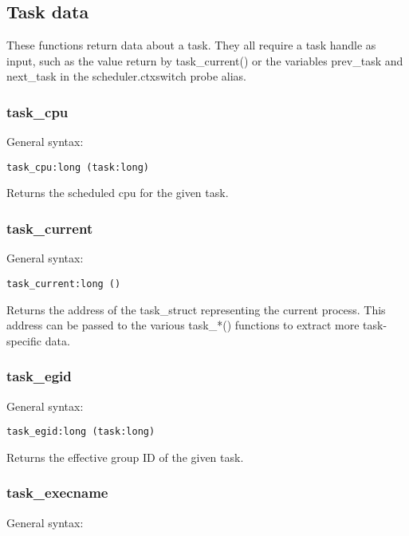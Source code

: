 \documentclass[twoside,english]{article}
\newenvironment{vindent}
{\begin{list}{}{\setlength{\listparindent}{6pt}}
\item[]}
{\end{list}}
\begin{document}
\subsection{Task data}

These functions return data about a task.  They all require a task handle as
input, such as the  value return by task\_current() or the variables
prev\_task and next\_task in the scheduler.ctxswitch probe alias.

\subsubsection{task\_cpu}
General syntax:

\begin{vindent}
\begin{verbatim}
task_cpu:long (task:long)
\end{verbatim}
\end{vindent}
Returns the scheduled cpu for the given task.


\subsubsection{task\_current}
General syntax:

\begin{vindent}
\begin{verbatim}
task_current:long ()
\end{verbatim}
\end{vindent}
Returns the address of the task\_struct representing
the current process. This address can be passed to the various task\_{*}()
functions to extract more task-specific data.


\subsubsection{task\_egid}
General syntax:

\begin{vindent}
\begin{verbatim}
task_egid:long (task:long)
\end{verbatim}
\end{vindent}
Returns the effective group ID of the given task.


\subsubsection{task\_execname}
General syntax:
\end{document}
